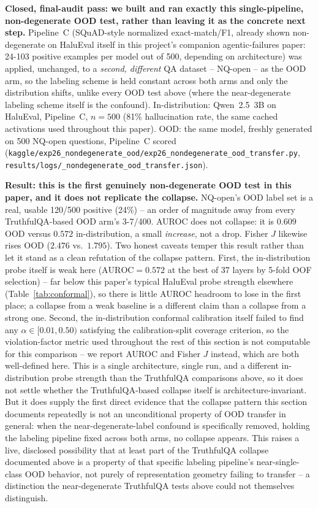 \documentclass[onecolumn]{jmlr}
\begin{document}
\textbf{Closed, final-audit pass: we built and ran exactly this
single-pipeline, non-degenerate OOD test, rather than leaving it as the
concrete next step.} Pipeline~C (SQuAD-style normalized exact-match/F1,
already shown non-degenerate on HaluEval itself in this project's
companion agentic-failures paper: 24-103 positive examples per model
out of 500, depending on architecture) was applied, unchanged, to a
\emph{second, different} QA dataset -- NQ-open -- as the OOD arm, so the
labeling scheme is held constant across both arms and only the
distribution shifts, unlike every OOD test above (where the
near-degenerate labeling scheme itself is the confound). In-distribution:
Qwen~2.5~3B on HaluEval, Pipeline~C, $n=500$ (81\% hallucination rate,
the same cached activations used throughout this paper). OOD: the same
model, freshly generated on 500 NQ-open questions, Pipeline~C scored
(\texttt{kaggle/\allowbreak exp26\_\allowbreak nondegenerate\_\allowbreak ood/\allowbreak exp26\_\allowbreak nondegenerate\_\allowbreak ood\_\allowbreak transfer.py},
\texttt{results/\allowbreak logs/\_\allowbreak nondegenerate\_\allowbreak ood\_\allowbreak transfer.json}).

\textbf{Result: this is the first genuinely non-degenerate OOD test in
this paper, and it does not replicate the collapse.} NQ-open's OOD label
set is a real, usable 120/500 positive (24\%) -- an order of magnitude
away from every TruthfulQA-based OOD arm's 3-7/400. AUROC does not
collapse: it is $0.609$ OOD versus $0.572$ in-distribution, a small
\emph{increase}, not a drop. Fisher $J$ likewise rises OOD ($2.476$ vs.\
$1.795$). Two honest caveats temper this result rather than let it stand
as a clean refutation of the collapse pattern. First, the in-distribution
probe itself is weak here ($\text{AUROC}=0.572$ at the best of 37
layers by 5-fold OOF selection) -- far below this paper's typical
HaluEval probe strength elsewhere (Table~\ref{tab:conformal}), so there
is little AUROC headroom to lose in the first place; a collapse from a
weak baseline is a different claim than a collapse from a strong one.
Second, the in-distribution conformal calibration itself failed to find
any $\alpha\in[0.01,0.50)$ satisfying the calibration-split coverage
criterion, so the violation-factor metric used throughout the rest of
this section is not computable for this comparison -- we report AUROC
and Fisher $J$ instead, which are both well-defined here. This is a
single architecture, single run, and a different in-distribution probe
strength than the TruthfulQA comparisons above, so it does not settle
whether the TruthfulQA-based collapse itself is architecture-invariant.
But it does supply the first direct evidence that the collapse pattern
this section documents repeatedly is not an unconditional property of
OOD transfer in general: when the near-degenerate-label confound is
specifically removed, holding the labeling pipeline fixed across both
arms, no collapse appears. This raises a live, disclosed possibility
that at least part of the TruthfulQA collapse documented above is a
property of that specific labeling pipeline's near-single-class OOD
behavior, not purely of representation geometry failing to transfer --
a distinction the near-degenerate TruthfulQA tests above could not
themselves distinguish.
\end{document}
